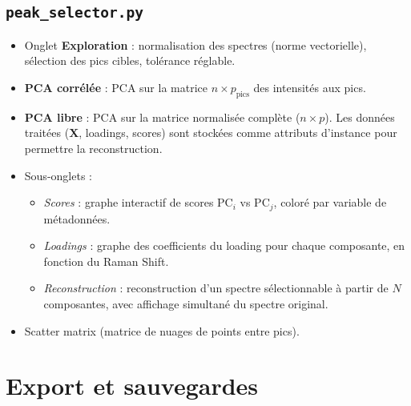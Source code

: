 \documentclass[12pt, a4paper]{article}
\newcommand{\X}{\mathbf{X}}
\begin{document}
\subsection{\texttt{peak\_selector.py}}

\begin{itemize}
  \item Onglet \textbf{Exploration} : normalisation des spectres (norme
        vectorielle), sélection des pics cibles, tolérance réglable.
  \item \textbf{PCA corrélée} : PCA sur la matrice $n \times p_\text{pics}$
        des intensités aux pics.
  \item \textbf{PCA libre} : PCA sur la matrice normalisée complète
        ($n \times p$). Les données traitées ($\X$, loadings, scores) sont
        stockées comme attributs d'instance pour permettre la reconstruction.
  \item Sous-onglets :
    \begin{itemize}
      \item \textit{Scores} : graphe interactif de scores PC$_i$ vs PC$_j$,
            coloré par variable de métadonnées.
      \item \textit{Loadings} : graphe des coefficients du loading pour chaque
            composante, en fonction du Raman Shift.
      \item \textit{Reconstruction} : reconstruction d'un spectre sélectionnable
            à partir de $N$ composantes, avec affichage simultané du spectre
            original.
    \end{itemize}
  \item Scatter matrix (matrice de nuages de points entre pics).
\end{itemize}

\section{Export et sauvegardes}
\end{document}
